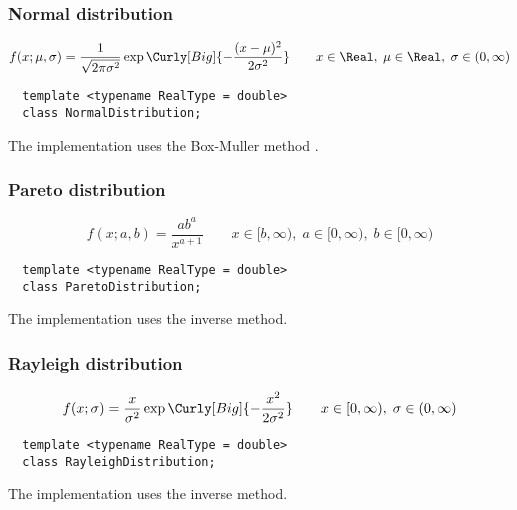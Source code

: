 \subsubsection{Normal distribution}

\begin{equation*}
  f(x;\mu,\sigma) =
  \frac{1}{\sqrt{2\pi\sigma^2}}
  \exp\Curly[Big]{-\frac{(x-\mu)^2}{2\sigma^2}} \qquad
  x \in \Real,\; \mu \in \Real,\; \sigma \in (0, \infty)
\end{equation*}
\begin{Verbatim}
  template <typename RealType = double>
  class NormalDistribution;
\end{Verbatim}
The implementation uses the Box-Muller method \parencite{Box:1958hv}.

\subsubsection{Pareto distribution}

\begin{equation*}
  f(x;a,b) = \frac{a b^a}{x^{a + 1}} \qquad
  x \in [b, \infty),\; a \in [0, \infty),\; b \in [0, \infty)
\end{equation*}
\begin{Verbatim}
  template <typename RealType = double>
  class ParetoDistribution;
\end{Verbatim}
The implementation uses the inverse method.

\subsubsection{Rayleigh distribution}

\begin{equation*}
  f(x;\sigma) =
  \frac{x}{\sigma^2}\exp\Curly[Big]{-\frac{x^2}{2\sigma^2}} \qquad
  x \in [0, \infty),\; \sigma \in (0, \infty)
\end{equation*}
\begin{Verbatim}
  template <typename RealType = double>
  class RayleighDistribution;
\end{Verbatim}
The implementation uses the inverse method.

